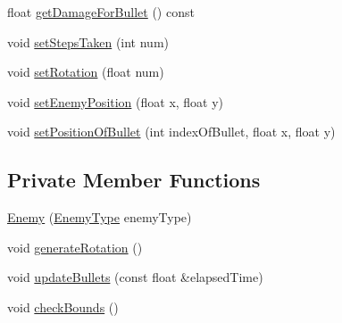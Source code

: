 \begin{DoxyCompactItemize}
float \hyperlink{class_enemy_a73e88b0f1e68650e6ea536c53a3cf920}{get\+Damage\+For\+Bullet} () const
\item 
void \hyperlink{class_enemy_a8ddda321d45a2fa6f35272087afe258b}{set\+Steps\+Taken} (int num)
\item 
void \hyperlink{class_enemy_ad02b7dfac0339e110f9aba837a815782}{set\+Rotation} (float num)
\item 
void \hyperlink{class_enemy_a6a83e4ff9dab297dbec1644dcc9152c6}{set\+Enemy\+Position} (float x, float y)
\item 
void \hyperlink{class_enemy_a49e2b8533dc258764e7a0ee5c4990eeb}{set\+Position\+Of\+Bullet} (int index\+Of\+Bullet, float x, float y)
\end{DoxyCompactItemize}
\subsection*{Private Member Functions}
\begin{DoxyCompactItemize}
\item 
\hyperlink{class_enemy_a57306ac8f82213245655f4c5377b1d76}{Enemy} (\hyperlink{_enemy_8h_ac3e413a86119db4b031458c7259e268e}{Enemy\+Type} enemy\+Type)
\item 
void \hyperlink{class_enemy_a66c71c54afd65734ed82983882a940e6}{generate\+Rotation} ()
\item 
void \hyperlink{class_enemy_a85b0344388ba2e073bd610cf88025037}{update\+Bullets} (const float \&elapsed\+Time)
\item 
void \hyperlink{class_enemy_ab446b847a18890227905674734f7017e}{check\+Bounds} ()
\end{DoxyCompactItemize}
